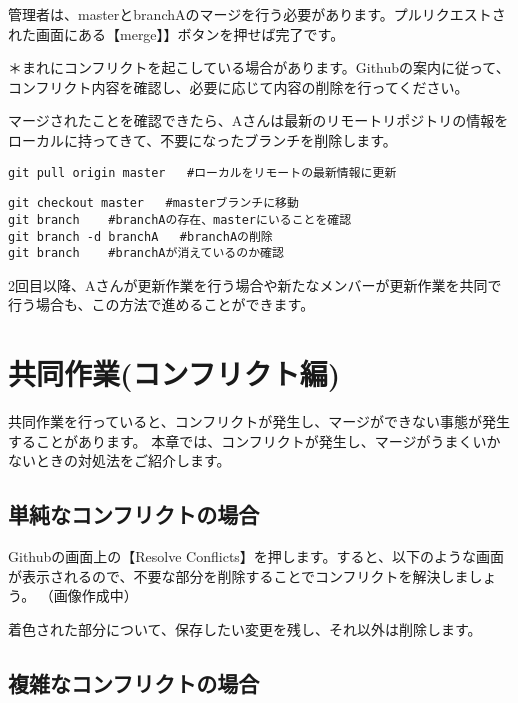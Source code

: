 \documentclass[
]{book}
\begin{document}
管理者は、masterとbranchAのマージを行う必要があります。プルリクエストされた画面にある【merge】】ボタンを押せば完了です。

＊まれにコンフリクトを起こしている場合があります。Githubの案内に従って、コンフリクト内容を確認し、必要に応じて内容の削除を行ってください。

マージされたことを確認できたら、Aさんは最新のリモートリポジトリの情報をローカルに持ってきて、不要になったブランチを削除します。

\begin{verbatim}
git pull origin master   #ローカルをリモートの最新情報に更新
\end{verbatim}

\begin{verbatim}
git checkout master   #masterブランチに移動
git branch    #branchAの存在、masterにいることを確認
git branch -d branchA   #branchAの削除
git branch    #branchAが消えているのか確認
\end{verbatim}

2回目以降、Aさんが更新作業を行う場合や新たなメンバーが更新作業を共同で行う場合も、この方法で進めることができます。

\hypertarget{ux5171ux540cux4f5cux696dux30b3ux30f3ux30d5ux30eaux30afux30c8ux7de8}{%
\chapter{共同作業(コンフリクト編)}\label{ux5171ux540cux4f5cux696dux30b3ux30f3ux30d5ux30eaux30afux30c8ux7de8}}

共同作業を行っていると、コンフリクトが発生し、マージができない事態が発生することがあります。
本章では、コンフリクトが発生し、マージがうまくいかないときの対処法をご紹介します。

\hypertarget{ux5358ux7d14ux306aux30b3ux30f3ux30d5ux30eaux30afux30c8ux306eux5834ux5408}{%
\section{単純なコンフリクトの場合}\label{ux5358ux7d14ux306aux30b3ux30f3ux30d5ux30eaux30afux30c8ux306eux5834ux5408}}

Githubの画面上の【Resolve Conflicts】を押します。すると、以下のような画面が表示されるので、不要な部分を削除することでコンフリクトを解決しましょう。
（画像作成中）

着色された部分について、保存したい変更を残し、それ以外は削除します。

\hypertarget{ux8907ux96d1ux306aux30b3ux30f3ux30d5ux30eaux30afux30c8ux306eux5834ux5408}{%
\section{複雑なコンフリクトの場合}\label{ux8907ux96d1ux306aux30b3ux30f3ux30d5ux30eaux30afux30c8ux306eux5834ux5408}}
\end{document}
